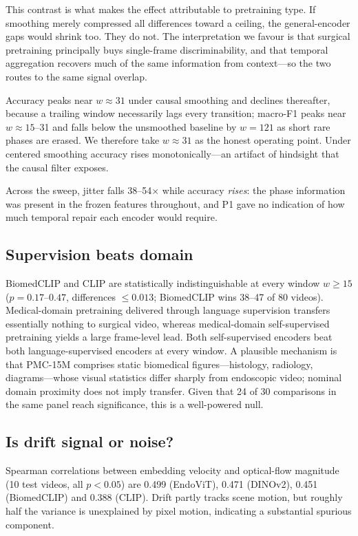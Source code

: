 \documentclass[10pt,twocolumn]{article}
\begin{document}
This contrast is what makes the effect attributable to pretraining type. If
smoothing merely compressed all differences toward a ceiling, the
general-encoder gaps would shrink too. They do not. The interpretation we
favour is that surgical pretraining principally buys single-frame
discriminability, and that temporal aggregation recovers much of the same
information from context---so the two routes to the same signal overlap.

Accuracy peaks near $w\approx31$ under causal smoothing and declines thereafter,
because a trailing window necessarily lags every transition; macro-F1 peaks
near $w\approx15$--31 and falls below the unsmoothed baseline by $w=121$ as
short rare phases are erased. We therefore take $w\approx31$ as the honest
operating point. Under centered smoothing accuracy rises monotonically---an
artifact of hindsight that the causal filter exposes.

Across the sweep, jitter falls 38--54$\times$ while accuracy \emph{rises}: the
phase information was present in the frozen features throughout, and P1 gave no
indication of how much temporal repair each encoder would require.

\subsection{Supervision beats domain}
\label{sec:supervision}
BiomedCLIP and CLIP are statistically indistinguishable at every window
$w\geq15$ ($p=0.17$--$0.47$, differences $\leq0.013$; BiomedCLIP wins 38--47 of 80 videos).
Medical-domain pretraining delivered through language supervision transfers
essentially nothing to surgical video, whereas medical-domain self-supervised
pretraining yields a large frame-level lead. Both self-supervised encoders beat
both language-supervised encoders at every window. A plausible mechanism is
that PMC-15M comprises static biomedical figures---histology, radiology,
diagrams---whose visual statistics differ sharply from endoscopic video;
nominal domain proximity does not imply transfer. Given that 24 of 30
comparisons in the same panel reach significance, this is a well-powered null.

\subsection{Is drift signal or noise?}
\label{sec:flow}
Spearman correlations between embedding velocity and optical-flow magnitude
(10 test videos, all $p<0.05$) are 0.499 (EndoViT), 0.471 (DINOv2), 0.451
(BiomedCLIP) and 0.388 (CLIP). Drift partly tracks scene motion, but roughly
half the variance is unexplained by pixel motion, indicating a substantial
spurious component.
\end{document}
